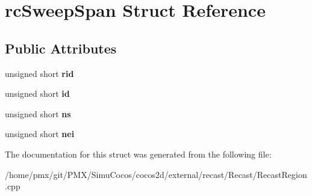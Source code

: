 \hypertarget{structrcSweepSpan}{}\section{rc\+Sweep\+Span Struct Reference}
\label{structrcSweepSpan}
\subsection*{Public Attributes}
\begin{DoxyCompactItemize}
\item 
\mbox{\label{structrcSweepSpan_ab92de3221c19c2c9a2d716ea7680146f}} 
unsigned short {\bfseries rid}
\item 
\mbox{\label{structrcSweepSpan_ac1a82c65b0a40920eab883fc2b0aa706}} 
unsigned short {\bfseries id}
\item 
\mbox{\label{structrcSweepSpan_afa7aea20a3d345b6663799f60d846737}} 
unsigned short {\bfseries ns}
\item 
\mbox{\label{structrcSweepSpan_a4d7da0d9409cf1124f8fed63783da60e}} 
unsigned short {\bfseries nei}
\end{DoxyCompactItemize}


The documentation for this struct was generated from the following file\+:\begin{DoxyCompactItemize}
\item 
/home/pmx/git/\+P\+M\+X/\+Simu\+Cocos/cocos2d/external/recast/\+Recast/Recast\+Region.\+cpp\end{DoxyCompactItemize}

